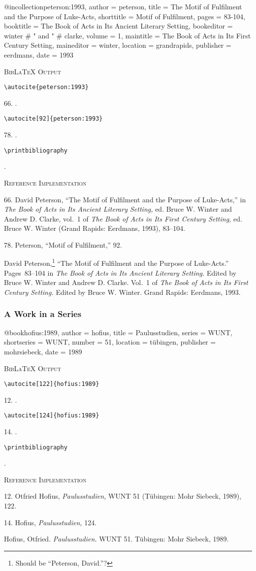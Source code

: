 \documentclass[a4paper]{article}
\newcommand\citetest[5]{%
  {\textsc{BibLaTeX Output}\par
   \nobreak
   \texttt{\textbackslash autocite[#2]\{#5\}}\par
   \color{biblatex-colour}
   #1. \cite[#2]{#5}.\par
   \color{black}
   \texttt{\textbackslash autocite[#4]\{#5\}}\par
   \color{biblatex-colour}
   #3. \cite[#4]{#5}.\par
   \color{black}
   \texttt{\textbackslash printbibliography}\par
   \color{biblatex-colour}
   \hangindent\bibindent\bibentrycite{#5}.\par}}
\newcommand\citetestnpf[4]{%
  {\textsc{BibLaTeX Output}\par
   \nobreak
   \texttt{\textbackslash autocite\{#4\}}\par
   \color{biblatex-colour}
   #1. \cite{#4}.\par
   \color{black}
   \texttt{\textbackslash autocite[#3]\{#4\}}\par
   \color{biblatex-colour}
   #2. \cite[#3]{#4}.\par
   \color{black}
   \texttt{\textbackslash printbibliography}\par
   \color{biblatex-colour}
   \hangindent\bibindent\bibentrycite{#4}.\par}}
\newenvironment{refimp}{%
  \begin{minipage}{\linewidth}
    \setlength{\parskip}{1ex}
    \textsc{Reference Implementation}\par
    \nobreak
    \color{reference-colour}
}{\end{minipage}}
\newenvironment{vb}{%
  \setlength{\parskip}{0pt}
  \verbatim}{\endverbatim}
\begin{document}
\begin{vb}
@incollection{peterson:1993,
  author = peterson,
  title = {The Motif of Fulfilment and the Purpose of Luke-Acts},
  shorttitle = {Motif of Fulfilment},
  pages = {83-104},
  booktitle = {The Book of Acts in Its Ancient Literary Setting},
  bookeditor = winter # " and " # clarke,
  volume = {1},
  maintitle = {The Book of Acts in Its First Century Setting},
  maineditor = winter,
  location = grandrapids,
  publisher = eerdmans,
  date = {1993}
}
\end{vb}  

\citetestnpf{66}{78}{92}{peterson:1993}

\begin{refimp}
  66. David Peterson, “The Motif of Fulfilment and the Purpose of Luke-Acts,”
  in \emph{The Book of Acts in Its Ancient Literary Setting,} ed. Bruce W.
  Winter and Andrew D. Clarke, vol.~1 of \emph{The Book of Acts in Its First
  Century Setting,} ed. Bruce W. Winter (Grand Rapids: Eerdmans, 1993),
  83–104.

  78. Peterson, “Motif of Fulfilment,” 92.

  \hangindent\bibindent David Peterson,\footnote{Should be “Peterson,
  David.”?} “The Motif of Fulfilment and the Purpose of Luke-Acts.”
  Pages~83–104 in \emph{The Book of Acts in Its Ancient Literary Setting.}
  Edited by Bruce W. Winter and Andrew D. Clarke. Vol.~1 of \emph{The Book of
  Acts in Its First Century Setting.} Edited by Bruce W. Winter. Grand Rapids:
  Eerdmans, 1993.
\end{refimp}

\subsubsection{A Work in a Series}

\begin{vb}
@book{hofius:1989,
  author = hofius,
  title = {Paulusstudien},
  series = WUNT,
  shortseries = {WUNT},
  number = {51},
  location = tübingen,
  publisher = mohrsiebeck,
  date = {1989}
}
\end{vb}  

\citetest{12}{122}{14}{124}{hofius:1989}

\begin{refimp}
  12. Otfried Hofius, \emph{Paulusstudien,} WUNT 51 (Tübingen: Mohr Siebeck,
  1989), 122.

  14. Hofius, \emph{Paulusstudien,} 124.

  Hofius, Otfried. \emph{Paulusstudien.} WUNT 51. Tübingen: Mohr Siebeck,
  1989.
\end{refimp}
\end{document}
